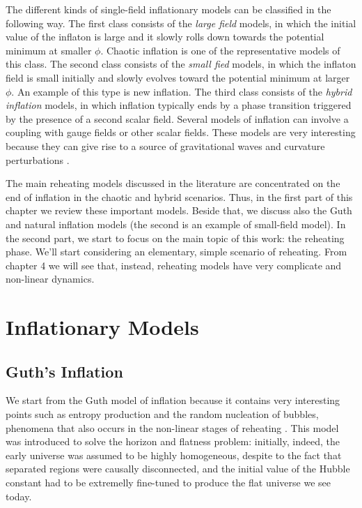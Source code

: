 \documentclass[11pt,a4paper,twoside]{book}
\begin{document}
The different kinds of single-field inflationary models can be classified in the following way. The first class consists of the \textit{large field} models, in which the initial value of the inflaton is large and it slowly rolls down towards  the potential minimum at smaller $\phi$. Chaotic inflation is one of the representative models of this class. The second class consists of the \textit{small fied} models, in which the inflaton field is small initially and slowly evolves toward the potential minimum at larger $\phi$. An example of this type is new inflation. The third class consists of the \textit{hybrid inflation} models, in which inflation typically ends by a phase transition triggered by the presence of a second scalar field.
Several models of inflation can involve a coupling with gauge fields or other scalar fields. These models are very interesting because they can give rise to a source of gravitational waves and curvature perturbations \cite{GWFromInflation:Intro}. 

The main reheating models discussed in the literature are concentrated on the end of inflation in the chaotic and hybrid scenarios. Thus, in the first part of this chapter we review these important models. Beside that, we discuss also the Guth and natural inflation models (the second is an example of small-field model). In the second part,  we start to focus on the main topic of this work: the reheating phase. We'll start considering an elementary, simple scenario of reheating. From chapter 4 we will see that, instead, reheating models have very complicate and non-linear dynamics. 

\section{Inflationary Models}
\subsection{Guth's Inflation}
We start from the Guth model of inflation because it contains very interesting points such as entropy production and the random nucleation of bubbles, phenomena that also occurs in the non-linear stages of reheating \cite{Guth:Intro}.
This model was introduced to solve the horizon and flatness problem: initially, indeed, the early universe was assumed to be highly homogeneous, despite to the fact that separated regions were causally disconnected, and the initial value of the Hubble constant had to be extremelly fine-tuned to produce the flat universe we see today.
\end{document}
